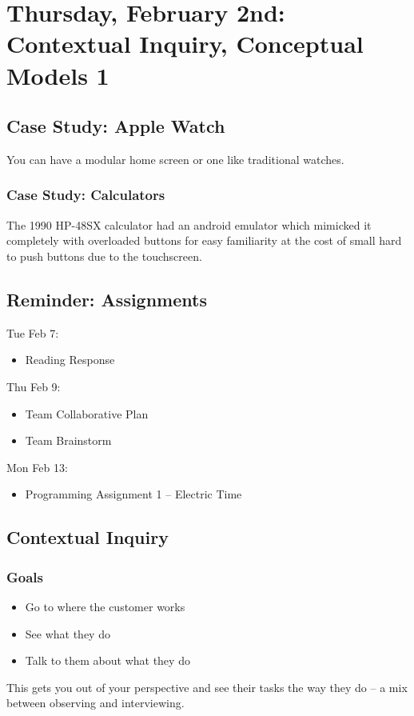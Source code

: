 \section{Thursday, February 2nd: Contextual Inquiry, Conceptual Models 1}
\subsection{Case Study: Apple Watch}
You can have a modular home screen or one like traditional watches.

\subsubsection{Case Study: Calculators}
The 1990 HP-48SX calculator had an android emulator which mimicked it completely with overloaded buttons for easy familiarity at the cost of small hard to push buttons due to the touchscreen.

\subsection{Reminder: Assignments}
Tue Feb 7:
\begin{itemize}
\item Reading Response
\end{itemize}

Thu Feb 9:
\begin{itemize}
\item Team Collaborative Plan
\item Team Brainstorm
\end{itemize}

Mon Feb 13:
\begin{itemize}
\item Programming Assignment 1 – Electric Time
\end{itemize}

\subsection{Contextual Inquiry}
\subsubsection{Goals}
\begin{itemize}
    \item Go to where the customer works
    \item See what they do
    \item Talk to them about what they do
\end{itemize}
This gets you out of your perspective and see their tasks the way they do -- a mix between observing and interviewing.

